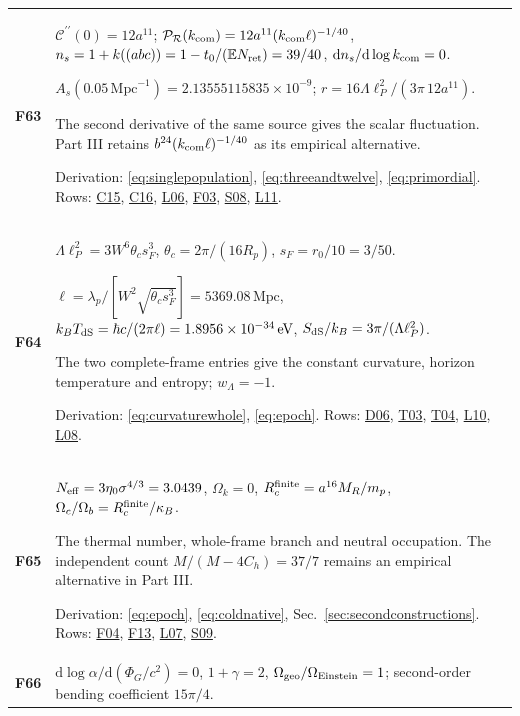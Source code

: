\documentclass[aps,prx,onecolumn,10pt,notitlepage,nofootinbib,longbibliography]{revtex4-2}
\numberwithin{equation}{section}
\numberwithin{table}{section}
\newcommand{\EE}{\mathbb E}
\newcommand{\dd}{\mathrm d}
\newcommand{\eV}{\,\mathrm{eV}}
\begin{document}
\begin{longtable}{@{}>{\raggedright\arraybackslash}p{}>{\raggedright\arraybackslash}p{}@{}}
\hypertarget{formula-F63}{}\textbf{F63}\label{formula:F63} & $\mathcal C^{\prime\prime}(0)=12a^{11}$; $\mathcal P_{\mathcal R}(k_{\rm com})=12a^{11}(k_{\rm com}\ell)^{-1/40}$, $n_s=1+k((abc))=1-t_0/(\EE N_{\rm ret})=39/40$, $\dd n_s/\dd\log k_{\rm com}=0$.\par $A_s(0.05\,\mathrm{Mpc}^{-1})=2.13555115835\times10^{-9}$; $r=16\Lambda\ell_P^2/(3\pi\,12a^{11})$.\par
The second derivative of the same source gives the scalar fluctuation. Part III retains $b^{24}(k_{\rm com}\ell)^{-1/40}$ as its empirical alternative.\par
Derivation: \eqref{eq:singlepopulation}, \eqref{eq:threeandtwelve}, \eqref{eq:primordial}. Rows: \hyperlink{row-C15}{C15}, \hyperlink{row-C16}{C16}, \hyperlink{row-L06}{L06}, \hyperlink{row-F03}{F03}, \hyperlink{row-S08}{S08}, \hyperlink{row-L11}{L11}.\\[7pt]
\hypertarget{formula-F64}{}\textbf{F64}\label{formula:F64} & $\Lambda\ell_P^2=3W^6\theta_cs_F^3$, $\theta_c=2\pi/(16R_p)$, $s_F=r_0/10=3/50$.\par $\ell=\lambda_p/[W^2\sqrt{\theta_cs_F^3}]=5369.08\,\mathrm{Mpc}$, $k_BT_{\rm dS}=\hbar c/(2\pi\ell)=1.8956\times10^{-34}\eV$, $S_{\rm dS}/k_B=3\pi/(\Lambda\ell_P^2)$.\par
The two complete-frame entries give the constant curvature, horizon temperature and entropy; $w_\Lambda=-1$.\par
Derivation: \eqref{eq:curvaturewhole}, \eqref{eq:epoch}. Rows: \hyperlink{row-D06}{D06}, \hyperlink{row-T03}{T03}, \hyperlink{row-T04}{T04}, \hyperlink{row-L10}{L10}, \hyperlink{row-L08}{L08}.\\[7pt]
\hypertarget{formula-F65}{}\textbf{F65}\label{formula:F65} & $N_{\rm eff}=3\eta_0\sigma^{4/3}=3.0439$, $\Omega_k=0$, $R_c^{\rm finite}=a^{16}M_R/m_p$, $\Omega_c/\Omega_b=R_c^{\rm finite}/\kappa_B$.\par
The thermal number, whole-frame branch and neutral occupation. The independent count $M/(M-4C_h)=37/7$ remains an empirical alternative in Part III.\par
Derivation: \eqref{eq:epoch}, \eqref{eq:coldnative}, Sec.~\ref{sec:secondconstructions}. Rows: \hyperlink{row-F04}{F04}, \hyperlink{row-F13}{F13}, \hyperlink{row-L07}{L07}, \hyperlink{row-S09}{S09}.\\[7pt]
\hypertarget{formula-F66}{}\textbf{F66}\label{formula:F66} & $\dd\log\alpha/\dd(\Phi_G/c^2)=0$, $1+\gamma=2$, $\Omega_{\rm geo}/\Omega_{\rm Einstein}=1$; second-order bending coefficient $15\pi/4$.\par

\end{longtable}
\end{document}
